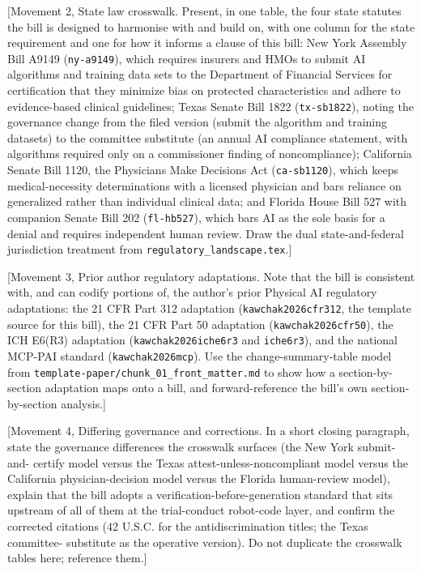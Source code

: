 [Movement 2, State law crosswalk. Present, in one table, the four state statutes
the bill is designed to harmonise with and build on, with one column for the
state requirement and one for how it informs a clause of this bill: New York
Assembly Bill A9149 (\texttt{ny-a9149}), which requires insurers and HMOs to
submit AI algorithms and training data sets to the Department of Financial
Services for certification that they minimize bias on protected characteristics
and adhere to evidence-based clinical guidelines; Texas Senate Bill 1822
(\texttt{tx-sb1822}), noting the governance change from the filed version (submit
the algorithm and training datasets) to the committee substitute (an annual AI
compliance statement, with algorithms required only on a commissioner finding of
noncompliance); California Senate Bill 1120, the Physicians Make Decisions Act
(\texttt{ca-sb1120}), which keeps medical-necessity determinations with a licensed
physician and bars reliance on generalized rather than individual clinical data;
and Florida House Bill 527 with companion Senate Bill 202 (\texttt{fl-hb527}),
which bars AI as the sole basis for a denial and requires independent human
review. Draw the dual state-and-federal jurisdiction treatment from
\texttt{regulatory\_landscape.tex}.]

[Movement 3, Prior author regulatory adaptations. Note that the bill is consistent
with, and can codify portions of, the author's prior Physical AI regulatory
adaptations: the 21 CFR Part 312 adaptation (\texttt{kawchak2026cfr312}, the
template source for this bill), the 21 CFR Part 50 adaptation
(\texttt{kawchak2026cfr50}), the ICH E6(R3) adaptation (\texttt{kawchak2026iche6r3}
and \texttt{iche6r3}), and the national MCP-PAI standard (\texttt{kawchak2026mcp}).
Use the change-summary-table model from
\texttt{template-paper/chunk\_01\_front\_matter.md} to show how a section-by-
section adaptation maps onto a bill, and forward-reference the bill's own
section-by-section analysis.]

[Movement 4, Differing governance and corrections. In a short closing paragraph,
state the governance differences the crosswalk surfaces (the New York submit-and-
certify model versus the Texas attest-unless-noncompliant model versus the
California physician-decision model versus the Florida human-review model), explain
that the bill adopts a verification-before-generation standard that sits upstream
of all of them at the trial-conduct robot-code layer, and confirm the corrected
citations (42 U.S.C. for the antidiscrimination titles; the Texas committee-
substitute as the operative version). Do not duplicate the crosswalk tables here;
reference them.]

